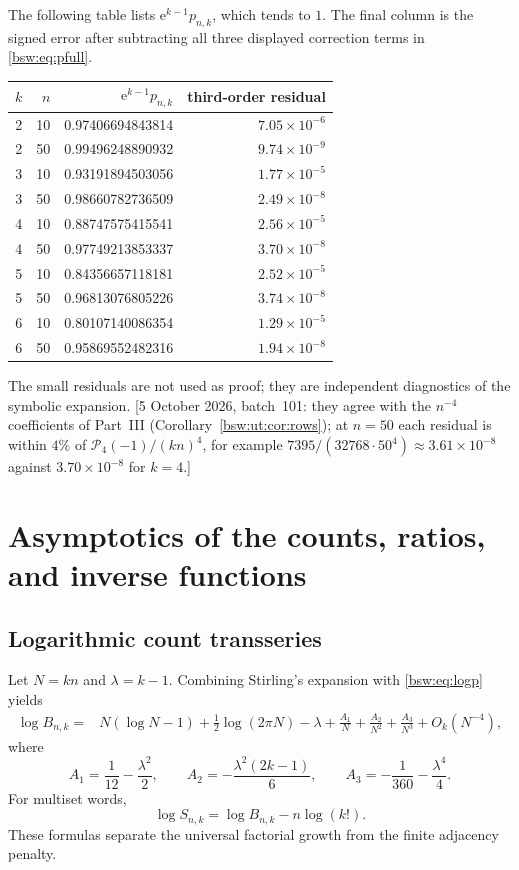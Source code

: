 \documentclass[11pt,letterpaper]{article}
\theoremstyle{definition}
\theoremstyle{remark}
\newcommand{\ee}{\mathrm e}
\begin{document}
The following table lists $\ee^{k-1}p_{n,k}$, which tends to $1$.  The final
column is the signed error after subtracting all three displayed correction
terms in \eqref{bsw:eq:pfull}.
\begin{center}
\begin{tabular}{rrrr}
\toprule
$k$ & $n$ & $\ee^{k-1}p_{n,k}$ & third-order residual\\
\midrule
2&10&0.97406694843814&$7.05\times10^{-6}$\\
2&50&0.99496248890932&$9.74\times10^{-9}$\\
3&10&0.93191894503056&$1.77\times10^{-5}$\\
3&50&0.98660782736509&$2.49\times10^{-8}$\\
4&10&0.88747575415541&$2.56\times10^{-5}$\\
4&50&0.97749213853337&$3.70\times10^{-8}$\\
5&10&0.84356657118181&$2.52\times10^{-5}$\\
5&50&0.96813076805226&$3.74\times10^{-8}$\\
6&10&0.80107140086354&$1.29\times10^{-5}$\\
6&50&0.95869552482316&$1.94\times10^{-8}$\\
\bottomrule
\end{tabular}
\end{center}
The small residuals are not used as proof; they are independent diagnostics
of the symbolic expansion.
[5 October 2026, batch~101: they agree with the $n^{-4}$ coefficients of
Part~III (Corollary~\ref{bsw:ut:cor:rows}); at $n=50$ each residual is
within $4\%$ of $\mathcal P_4(-1)/(kn)^4$, for example
$7395/(32768\cdot50^4)\approx3.61\times10^{-8}$ against $3.70\times10^{-8}$
for $k=4$.]

\section{Asymptotics of the counts, ratios, and inverse functions}

\subsection{Logarithmic count transseries}

Let $N=kn$ and $\lambda=k-1$.  Combining Stirling's expansion with
\eqref{bsw:eq:logp} yields
\begin{align}
 \log B_{n,k}
={}&N(\log N-1)+\frac12\log(2\pi N)-\lambda
 +\frac{A_1}{N}+\frac{A_2}{N^2}+\frac{A_3}{N^3}
 +O_k(N^{-4}),
\label{bsw:eq:logB}
\end{align}
where
\begin{equation}\label{bsw:eq:A123}
 A_1=\frac1{12}-\frac{\lambda^2}{2},\qquad
 A_2=-\frac{\lambda^2(2k-1)}6,\qquad
 A_3=-\frac1{360}-\frac{\lambda^4}{4}.
\end{equation}
For multiset words,
\begin{equation}\label{bsw:eq:logS}
 \log S_{n,k}=\log B_{n,k}-n\log(k!).
\end{equation}
These formulas separate the universal factorial growth from the finite
adjacency penalty.
\end{document}
